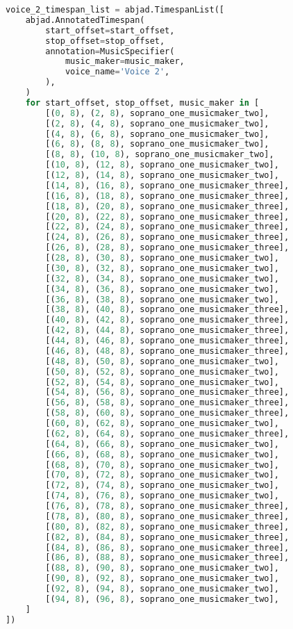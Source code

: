 \begin{lstlisting}[language=Python, caption=Invocation Source Code]
voice_2_timespan_list = abjad.TimespanList([
    abjad.AnnotatedTimespan(
        start_offset=start_offset,
        stop_offset=stop_offset,
        annotation=MusicSpecifier(
            music_maker=music_maker,
            voice_name='Voice 2',
        ),
    )
    for start_offset, stop_offset, music_maker in [
        [(0, 8), (2, 8), soprano_one_musicmaker_two],
        [(2, 8), (4, 8), soprano_one_musicmaker_two],
        [(4, 8), (6, 8), soprano_one_musicmaker_two],
        [(6, 8), (8, 8), soprano_one_musicmaker_two],
        [(8, 8), (10, 8), soprano_one_musicmaker_two],
        [(10, 8), (12, 8), soprano_one_musicmaker_two],
        [(12, 8), (14, 8), soprano_one_musicmaker_two],
        [(14, 8), (16, 8), soprano_one_musicmaker_three],
        [(16, 8), (18, 8), soprano_one_musicmaker_three],
        [(18, 8), (20, 8), soprano_one_musicmaker_three],
        [(20, 8), (22, 8), soprano_one_musicmaker_three],
        [(22, 8), (24, 8), soprano_one_musicmaker_three],
        [(24, 8), (26, 8), soprano_one_musicmaker_three],
        [(26, 8), (28, 8), soprano_one_musicmaker_three],
        [(28, 8), (30, 8), soprano_one_musicmaker_two],
        [(30, 8), (32, 8), soprano_one_musicmaker_two],
        [(32, 8), (34, 8), soprano_one_musicmaker_two],
        [(34, 8), (36, 8), soprano_one_musicmaker_two],
        [(36, 8), (38, 8), soprano_one_musicmaker_two],
        [(38, 8), (40, 8), soprano_one_musicmaker_three],
        [(40, 8), (42, 8), soprano_one_musicmaker_three],
        [(42, 8), (44, 8), soprano_one_musicmaker_three],
        [(44, 8), (46, 8), soprano_one_musicmaker_three],
        [(46, 8), (48, 8), soprano_one_musicmaker_three],
        [(48, 8), (50, 8), soprano_one_musicmaker_two],
        [(50, 8), (52, 8), soprano_one_musicmaker_two],
        [(52, 8), (54, 8), soprano_one_musicmaker_two],
        [(54, 8), (56, 8), soprano_one_musicmaker_three],
        [(56, 8), (58, 8), soprano_one_musicmaker_three],
        [(58, 8), (60, 8), soprano_one_musicmaker_three],
        [(60, 8), (62, 8), soprano_one_musicmaker_two],
        [(62, 8), (64, 8), soprano_one_musicmaker_three],
        [(64, 8), (66, 8), soprano_one_musicmaker_two],
        [(66, 8), (68, 8), soprano_one_musicmaker_two],
        [(68, 8), (70, 8), soprano_one_musicmaker_two],
        [(70, 8), (72, 8), soprano_one_musicmaker_two],
        [(72, 8), (74, 8), soprano_one_musicmaker_two],
        [(74, 8), (76, 8), soprano_one_musicmaker_two],
        [(76, 8), (78, 8), soprano_one_musicmaker_three],
        [(78, 8), (80, 8), soprano_one_musicmaker_three],
        [(80, 8), (82, 8), soprano_one_musicmaker_three],
        [(82, 8), (84, 8), soprano_one_musicmaker_three],
        [(84, 8), (86, 8), soprano_one_musicmaker_three],
        [(86, 8), (88, 8), soprano_one_musicmaker_three],
        [(88, 8), (90, 8), soprano_one_musicmaker_two],
        [(90, 8), (92, 8), soprano_one_musicmaker_two],
        [(92, 8), (94, 8), soprano_one_musicmaker_two],
        [(94, 8), (96, 8), soprano_one_musicmaker_two],
    ]
])


\end{lstlisting}
